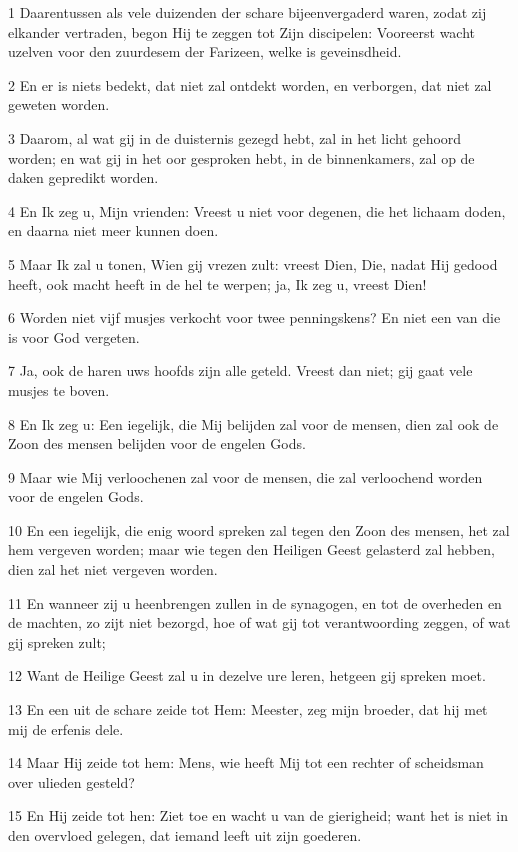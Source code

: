 \par 1 Daarentussen als vele duizenden der schare bijeenvergaderd waren, zodat zij elkander vertraden, begon Hij te zeggen tot Zijn discipelen: Vooreerst wacht uzelven voor den zuurdesem der Farizeen, welke is geveinsdheid.
\par 2 En er is niets bedekt, dat niet zal ontdekt worden, en verborgen, dat niet zal geweten worden.
\par 3 Daarom, al wat gij in de duisternis gezegd hebt, zal in het licht gehoord worden; en wat gij in het oor gesproken hebt, in de binnenkamers, zal op de daken gepredikt worden.
\par 4 En Ik zeg u, Mijn vrienden: Vreest u niet voor degenen, die het lichaam doden, en daarna niet meer kunnen doen.
\par 5 Maar Ik zal u tonen, Wien gij vrezen zult: vreest Dien, Die, nadat Hij gedood heeft, ook macht heeft in de hel te werpen; ja, Ik zeg u, vreest Dien!
\par 6 Worden niet vijf musjes verkocht voor twee penningskens? En niet een van die is voor God vergeten.
\par 7 Ja, ook de haren uws hoofds zijn alle geteld. Vreest dan niet; gij gaat vele musjes te boven.
\par 8 En Ik zeg u: Een iegelijk, die Mij belijden zal voor de mensen, dien zal ook de Zoon des mensen belijden voor de engelen Gods.
\par 9 Maar wie Mij verloochenen zal voor de mensen, die zal verloochend worden voor de engelen Gods.
\par 10 En een iegelijk, die enig woord spreken zal tegen den Zoon des mensen, het zal hem vergeven worden; maar wie tegen den Heiligen Geest gelasterd zal hebben, dien zal het niet vergeven worden.
\par 11 En wanneer zij u heenbrengen zullen in de synagogen, en tot de overheden en de machten, zo zijt niet bezorgd, hoe of wat gij tot verantwoording zeggen, of wat gij spreken zult;
\par 12 Want de Heilige Geest zal u in dezelve ure leren, hetgeen gij spreken moet.
\par 13 En een uit de schare zeide tot Hem: Meester, zeg mijn broeder, dat hij met mij de erfenis dele.
\par 14 Maar Hij zeide tot hem: Mens, wie heeft Mij tot een rechter of scheidsman over ulieden gesteld?
\par 15 En Hij zeide tot hen: Ziet toe en wacht u van de gierigheid; want het is niet in den overvloed gelegen, dat iemand leeft uit zijn goederen.
